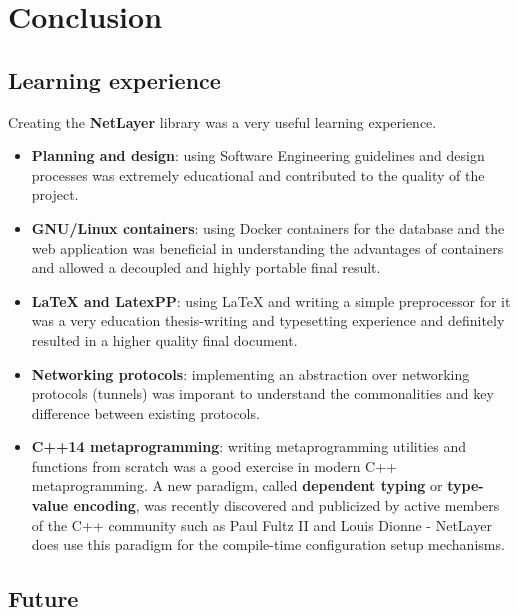 \documentclass[11pt]{report}
\newcommand{\+}{\discretionary{\mbox{\scriptsize$\hookleftarrow$}}{}{}}
\renewcommand\emph{\textbf}
\begin{document}
\part{Conclusion}
    \chapter{Learning experience}

        Creating the \emph{NetLayer} library was a very useful learning experience.

        \begin{itemize}
            \item \emph{Planning and design}: using Software Engineering guidelines and design processes was extremely educational and contributed to the quality of the project. 
            
            \item \emph{GNU/Linux containers}: using Docker containers for the database and the web application was beneficial in understanding the advantages of containers and allowed a decoupled and highly portable final result.
            
            \item \emph{\LaTeX{} and LatexPP}: using \LaTeX{} and writing a simple preprocessor for it was a very education thesis-writing and typesetting experience and definitely resulted in a higher quality final document.

            \item \emph{Networking protocols}: implementing an abstraction over networking protocols (tunnels) was imporant to understand the commonalities and key difference between existing protocols.

            \item \emph{C++14 metaprogramming}: writing metaprogramming utilities and functions from scratch was a good exercise in modern C++ metaprogramming. A new paradigm, called \emph{dependent typing} or \emph{type-value encoding}, was recently discovered and publicized by active members of the C++ community such as Paul Fultz II and Louis Dionne - NetLayer does use this paradigm for the compile-time configuration setup mechanisms.
        \end{itemize}

    \chapter{Future}
        
\end{document}
